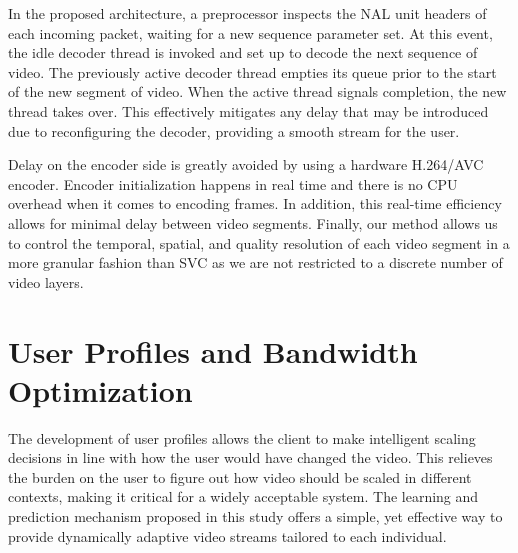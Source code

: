 In the proposed architecture, a preprocessor inspects the NAL unit headers of each incoming packet, waiting for a new sequence parameter set. At this event, the idle decoder thread is invoked and set up to decode the next sequence of video. The previously active decoder thread empties its queue prior to the start of the new segment of video. When the active thread signals completion, the new thread takes over. This effectively mitigates any delay that may be introduced due to reconfiguring the decoder, providing a smooth stream for the user.

Delay on the encoder side is greatly avoided by using a hardware H.264/AVC encoder. Encoder initialization happens in real time and there is no CPU overhead when it comes to encoding frames. In addition, this real-time efficiency allows for minimal delay between video segments. Finally, our method allows us to control the temporal, spatial, and quality resolution of each video segment in a more granular fashion than SVC as we are not restricted to a discrete number of video layers.  




\section{User Profiles and Bandwidth Optimization}
\label{sec:UserProfiles}

The development of user profiles allows the client to make intelligent scaling decisions in line with how the user would have changed the video. This relieves the burden on the user to figure out how video should be scaled in different contexts, making it critical for a widely acceptable system. The learning and prediction mechanism proposed in this study offers a simple, yet effective way to provide dynamically adaptive video streams tailored to each individual.


